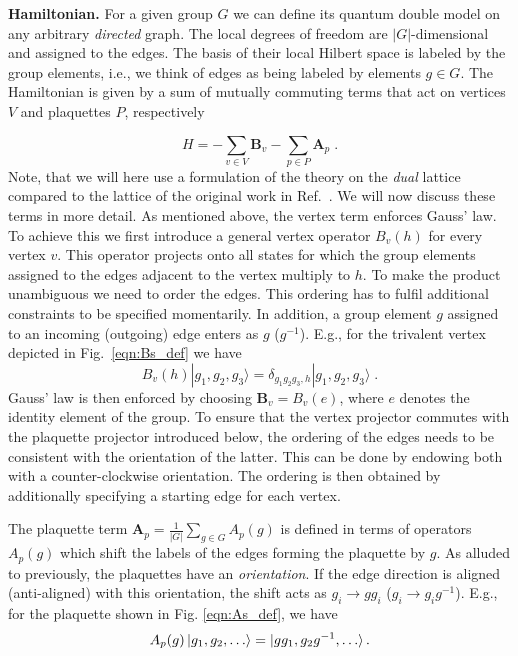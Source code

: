 \documentclass[a4paper,twocolumn,11pt]{quantumarticle}
\begin{document}
\textbf{Hamiltonian.}
For a given group $G$ we can define its quantum double model on any arbitrary \emph{directed} graph. The local degrees of freedom are $|G|$-dimensional and assigned to the edges. The basis of their local Hilbert space is labeled by the group elements, i.e., we think of edges as being labeled by elements $g\in G$. The Hamiltonian is given by a sum of mutually commuting terms that act on vertices $V$ and plaquettes $P$, respectively





\begin{equation}
    H = -  \sum_{v \in V} \mathbf B_v -  \sum_{p  \in  P} \mathbf A_p \label{eqn:ham} \;.
\end{equation}
Note, that we will here use a formulation of the theory on the \emph{dual} lattice compared to the lattice of the original work in Ref.~\cite{Kitaev_2003}.
We will now discuss these terms in more detail. As mentioned above, the vertex term enforces Gauss' law. To achieve this we first introduce a general vertex operator $B_v{(h)}$ for every vertex $v$. This operator projects onto all states for which the group elements assigned to the edges adjacent to the vertex multiply to $h$. To make the product unambiguous we need to order the edges. This ordering has to fulfil additional constraints to be specified momentarily. In addition, a group element $g$ assigned to an incoming (outgoing) edge enters as $g$ ($g^{-1}$). E.g., for the trivalent vertex depicted in Fig.~\ref{eqn:Bs_def} we have 
\begin{equation}
B_v{(h)} |g_1,g_2,g_3\rangle= \delta_{g_1 g_2 g_3,h} |g_1,g_2,g_3\rangle \;.	
\end{equation}
Gauss' law is then enforced by choosing $\mathbf B_v=B_v{(e)}$, where $e$ denotes the identity element of the group. To ensure that the vertex projector commutes with the plaquette projector introduced below, the ordering of the edges needs to be consistent with the orientation of the latter. This can be done by endowing both with a counter-clockwise orientation. The ordering is then obtained by additionally specifying a starting edge for each vertex.

The plaquette term 
	$\mathbf A_p=\frac{1}{|G|} \sum_{g \in G} A_p{(g)}$
is defined in terms of operators $A_p{(g)}$ which shift the labels of the edges forming the plaquette by $g$. As alluded to previously, the plaquettes have an \emph{orientation}. If the edge direction is aligned (anti-aligned) with this orientation, the shift acts as $g_i \rightarrow gg_i$ ($g_i \rightarrow g_ig^{-1}$). E.g., for the plaquette shown in Fig. \ref{eqn:As_def}, we have 
\begin{equation}
	A_p{(g)}\ket{g_1, g_2, \ldots} = \ket{gg_1, g_2g^{-1}, \ldots}.
\end{equation} 
\end{document}
